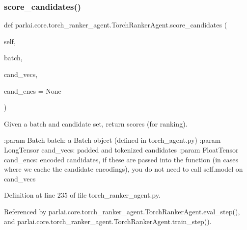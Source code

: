 \mbox{\label{classparlai_1_1core_1_1torch__ranker__agent_1_1TorchRankerAgent_a65d5726a4e2098212298bc2cdf13e70f}} 
\subsubsection{\texorpdfstring{score\+\_\+candidates()}{score\_candidates()}}
{\footnotesize\ttfamily def parlai.\+core.\+torch\+\_\+ranker\+\_\+agent.\+Torch\+Ranker\+Agent.\+score\+\_\+candidates (\begin{DoxyParamCaption}\item[{}]{self,  }\item[{}]{batch,  }\item[{}]{cand\+\_\+vecs,  }\item[{}]{cand\+\_\+encs = {\ttfamily None} }\end{DoxyParamCaption})}

\begin{DoxyVerb}Given a batch and candidate set, return scores (for ranking).

:param Batch batch:
    a Batch object (defined in torch_agent.py)
:param LongTensor cand_vecs:
    padded and tokenized candidates
:param FloatTensor cand_encs:
    encoded candidates, if these are passed into the function (in cases
    where we cache the candidate encodings), you do not need to call
    self.model on cand_vecs
\end{DoxyVerb}
 

Definition at line 235 of file torch\+\_\+ranker\+\_\+agent.\+py.



Referenced by parlai.\+core.\+torch\+\_\+ranker\+\_\+agent.\+Torch\+Ranker\+Agent.\+eval\+\_\+step(), and parlai.\+core.\+torch\+\_\+ranker\+\_\+agent.\+Torch\+Ranker\+Agent.\+train\+\_\+step().

